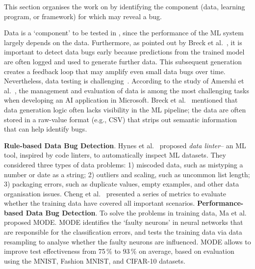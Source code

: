 \label{sec:privacy}

\label{sec:testingcomponents}
This section organises the work on \mlt{} by identifying the component (data, learning program, or framework) for which \mlt{} may reveal a bug.

\label{sec:datatesting}
Data is a `component' to be tested in \mlt{},
since the performance of the ML system largely depends on the data. 
Furthermore, as pointed out by Breck et al.~, 
it is important to detect data bugs early because
predictions from the trained model are often logged and used to generate further data.
This subsequent generation creates a feedback loop that may amplify even small data bugs over time.
Nevertheless, data testing is challenging~.
According to the study of Amershi et al.~, the management and evaluation of data is among the most challenging tasks when developing an AI application in Microsoft. 
Breck et al.~ mentioned that data generation logic often lacks visibility in the ML pipeline; the data are often stored in a raw-value format (e.g., CSV) that strips out semantic information that can help identify bugs.

\label{sec:bugdetectionintrainingdata}
\noindent \textbf{Rule-based Data Bug Detection}. Hynes et al.~ proposed \emph{data linter}-- an ML tool, inspired by code linters, to automatically inspect ML datasets.
They considered three types of data problems:
1) miscoded data, such as mistyping a number or date as a string;
2) outliers and scaling, such as uncommon list length;
3) packaging errors, such as duplicate values, empty examples, and other data organisation issues.
Cheng et al.~ presented a series of metrics to evaluate whether the training data have covered all important scenarios. 
\noindent \textbf{Performance-based Data Bug Detection}.
To solve the problems in training data, Ma et al.~ proposed MODE.
MODE identifies the `faulty neurons' in neural networks that are responsible for the classification errors, and tests the training data via data resampling to analyse whether the faulty neurons are influenced.
MODE allows to improve test effectiveness from 75\,\% to 93\,\% on average, based on evaluation using the MNIST, Fashion MNIST, and CIFAR-10 datasets.

